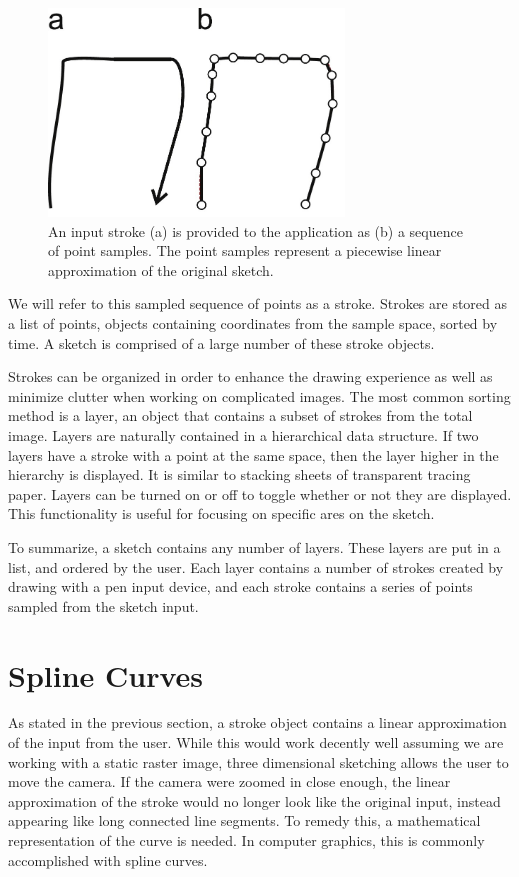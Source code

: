 \documentclass[12pt]{report}
\begin{document}
\begin{figure}
\includegraphics[width=0.7\textwidth]{stroke}
\caption{An input stroke (a) is provided to the application as (b) a sequence of point samples. The point samples represent a piecewise linear approximation of the original sketch.}
\end{figure}

We will refer to this sampled sequence of points as a stroke. 
Strokes are stored as a list of points, objects containing coordinates from the sample space, sorted by time.
A sketch is comprised of a large number of these stroke objects.

Strokes can be organized in order to enhance the drawing experience as well as minimize clutter when working on complicated images.
The most common sorting method is a layer, an object that contains a subset of strokes from the total image.
Layers are naturally contained in a hierarchical data structure. 
If two layers have a stroke with a point at the same space, then the layer higher in the hierarchy is displayed.
It is similar to stacking sheets of transparent tracing paper.
Layers can be turned on or off to toggle whether or not they are displayed.
This functionality is useful for focusing on specific ares on the sketch.

To summarize, a sketch contains any number of layers.
These layers are put in a list, and ordered by the user.
Each layer contains a number of strokes created by drawing with a pen input device, and each stroke contains a series of points sampled from the sketch input.

\section{Spline Curves}

As stated in the previous section, a stroke object contains a linear approximation of the input from the user. 
While this would work decently well assuming we are working with a static raster image, three dimensional sketching allows the user to move the camera.
If the camera were zoomed in close enough, the linear approximation of the stroke would no longer look like the original input, instead appearing like long connected line segments.
To remedy this, a mathematical representation of the curve is needed.
In computer graphics, this is commonly accomplished with spline curves.
\end{document}
